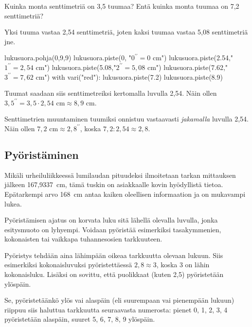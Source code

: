 \begin{esimerkki}
Kuinka monta senttimetriä on 3,5 tuumaa? Entä kuinka monta tuumaa on 7,2 senttimetriä?

	\begin{esimratk}
Yksi tuuma vastaa 2,54 senttimetriä, joten kaksi tuumaa vastaa 5,08 senttimetriä jne.
	
\begin{kuva}
	lukusuora.pohja(0,9,9)
	lukusuora.piste(0, "$0^{\prime \prime} = 0 $ cm")
	lukusuora.piste(2.54,"$1^{\prime \prime} = 2,54$ cm")
	lukusuora.piste(5.08,"$2^{\prime \prime} = 5,08$ cm")
	lukusuora.piste(7.62,"$3^{\prime \prime} = 7,62$ cm")
	with vari("red"):
	  lukusuora.piste(7.2)
	  lukusuora.piste(8.9)
\end{kuva}

Tuumat saadaan siis senttimetreiksi kertomalla luvulla 2,54. Näin ollen $3,5^{\prime \prime} = 3,5 \cdot 2,54 \textrm{ cm} \approx 8,9 \textrm{ cm}$.

Senttimetrien muuntaminen tuumiksi onnistuu vastaavasti \emph{jakamalla} luvulla 2,54. Näin ollen $7,2 \textrm{ cm} \approx 2,8^{\prime \prime}$, koska $7,2 : 2,54 \approx 2,8$.
	\end{esimratk}
\end{esimerkki}

\subsection*{Pyöristäminen}

Mikäli urheiluliikkeessä lumilaudan pituudeksi ilmoitetaan tarkan mittauksen jälkeen 167,9337~cm, tämä tuskin on asiakkaalle kovin hyödyllistä tietoa. Epätarkempi arvo 168~cm antaa kaiken oleellisen informaation ja on mukavampi lukea.

Pyöristämisen ajatus on korvata luku sitä lähellä olevalla luvulla, jonka esitysmuoto on lyhyempi. Voidaan pyöristää esimerkiksi tasakymmenien, kokonaisten tai vaikkapa tuhannesosien tarkkuuteen.

Pyöristys tehdään aina lähimpään oikeaa tarkkuutta olevaan lukuun. Siis esimerkiksi kokonaisluvuksi pyöristettäessä $2,8 \approx 3$, koska 3 on lähin kokonaisluku. Lisäksi on sovittu, että puolikkaat (kuten 2,5) pyöristetään ylöspäin.

Se, pyöristetäänkö ylös vai alaspäin (eli suurempaan vai pienempään lukuun) riippuu siis haluttua tarkkuutta seuraavasta numerosta: pienet 0, 1, 2, 3, 4 pyöristetään alaspäin, suuret 5, 6, 7, 8, 9 ylöspäin.

